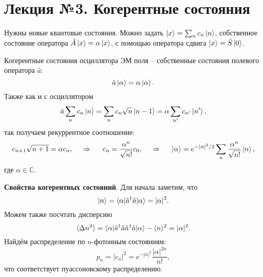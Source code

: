 \section*{Лекция №3. Когерентные состояния}





Нужны новые квантовые состояния. Можно задать $\left| x \right\rangle = \sum_n c_n \left| n \right\rangle$, собственное состояние оператора $\hat{A} \left| x \right\rangle = \alpha \left| x \right\rangle$, с помощью оператора сдвига $\left| x \right\rangle = \hat{S} \left| 0 \right\rangle$. 

Когерентные состояния осциллятора ЭМ поля -- собственные состояния полевого оператора $\hat{a}$:
\begin{equation*}
    \hat{a} \left| \alpha \right\rangle = \alpha \left| \alpha \right\rangle.
\end{equation*}
Также как и с осциллятором
\begin{equation*}
    \hat{a} \sum_n c_n \left| n \right\rangle = \sum_n c_n \sqrt{n} \left| n-1 \right\rangle = \alpha \sum_{n'} c_{n'} \left| n' \right\rangle,
\end{equation*}
так получаем рекуррентное соотношение:
\begin{equation*}
    c_{n+1} \sqrt{n+1} = \alpha c_n,
    \hspace{0.5cm} \Rightarrow \hspace{0.5cm}
    c_n = \frac{\alpha^n}{\sqrt{n!}} c_0,
    \hspace{0.5cm} \Rightarrow \hspace{0.5cm}
    \left| \alpha \right\rangle = e^{-|\alpha|^2/2} \sum_n \frac{\alpha^n}{\sqrt{n!}} \left| n \right\rangle,
\end{equation*}
где $\alpha \in \mathbb{C}$.

\textbf{Свойства когерентных состояний}. Для начала заметим, что
\begin{equation*}
    \ket{n} = \bk{\alpha}[\hat{a}\D \hat{a}]{\alpha} = |\alpha|^2.
\end{equation*}
Можем также посчтать дисперсию
\begin{equation*}
    \langle \Delta n^2\rangle = \bk{\alpha}[\hat{a}\D \hat{a} \hat{a}\D \hat{a}]{\alpha} - \langle n\rangle^2 = |\alpha|^2.
\end{equation*}
Найдём распределение по $n$-фотонным состояниям:
\begin{equation*}
    p_n = |c_n|^2 = e^{-|\alpha|^2} \frac{|\alpha|^{2n}}{n!},
\end{equation*}
что соответствует пуассоновскому распределению.



